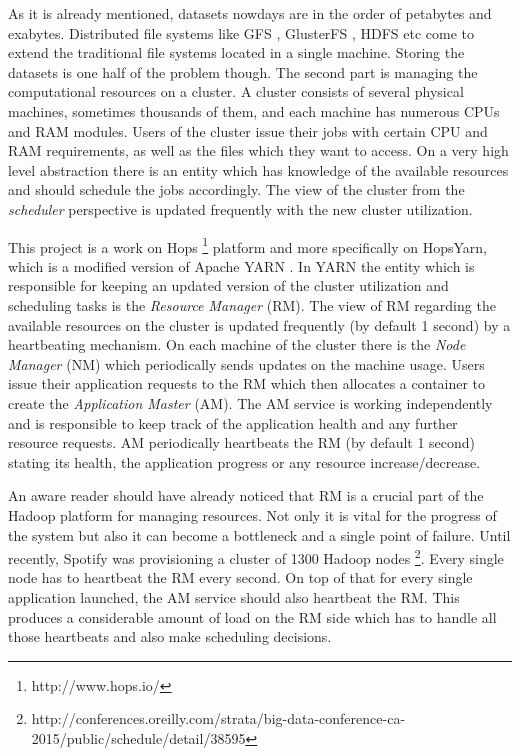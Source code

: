 As it is already mentioned, datasets nowdays are in the order of
petabytes and exabytes. Distributed file systems like GFS
\cite{Ghemawat:2003:GFS:1165389.945450}, 
GlusterFS \cite{glusterfs}, HDFS \cite{hdfs} etc come to extend
the traditional file systems located in a single machine. Storing the
datasets is one half of the problem though. The second part is
managing the computational resources on a cluster. A cluster consists
of several physical machines, sometimes thousands of them, and each
machine has numerous CPUs and RAM modules. Users of the cluster issue
their jobs with certain CPU and RAM requirements, as well as the files
which they want to access. On a very high level abstraction there is
an entity which has knowledge of the available resources and should
schedule the jobs accordingly. The view of the cluster from the
\emph{scheduler} perspective is updated frequently with the new
cluster utilization.

This project is a work on Hops \footnote{http://www.hops.io/} platform
and more specifically on HopsYarn, which is a modified version of
Apache YARN \cite{Vavilapalli:2013:AHY:2523616.2523633}. In YARN the
entity which is responsible for keeping an updated version of the
cluster utilization and scheduling tasks is the \emph{Resource
Manager} (RM). The view of RM regarding the available resources on the
cluster is updated frequently (by default 1 second) by a heartbeating
mechanism. On each machine of the cluster there is the \emph{Node
Manager} (NM) which periodically sends updates on the machine
usage. Users issue their application requests to the RM which then
allocates a container to create the \emph{Application Master}
(AM). The AM service is working independently and is responsible to
keep track of the application health and any further resource
requests. AM periodically heartbeats the RM (by default 1 second)
stating its health, the application progress or any resource
increase/decrease.

An aware reader should have already noticed that RM is a crucial part
of the Hadoop platform for managing resources. Not only it is vital
for the progress of the system but also it can become a
bottleneck and a single point of failure. Until recently, Spotify was
provisioning a cluster of 1300
Hadoop nodes \footnote{http://conferences.oreilly.com/strata/big-data-conference-ca-2015/public/schedule/detail/38595}. Every single node has to heartbeat the RM every
second. On top of that for every single application launched, the AM
service should also heartbeat the RM. This produces a considerable
amount of load on the RM side which has to handle all those heartbeats
and also make scheduling decisions.
